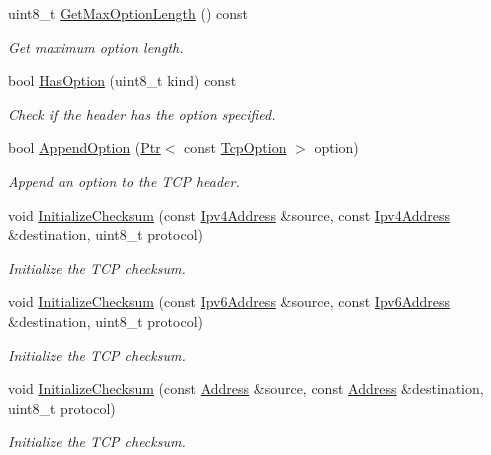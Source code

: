 \begin{DoxyCompactItemize}
uint8\+\_\+t \hyperlink{classns3_1_1TcpHeader_af2ba1251ef62ac43666868af87b79fcb}{Get\+Max\+Option\+Length} () const 
\begin{DoxyCompactList}\small\item\em Get maximum option length. \end{DoxyCompactList}\item 
bool \hyperlink{classns3_1_1TcpHeader_aacc07bdab91925f1cddf9bcb1ae91d13}{Has\+Option} (uint8\+\_\+t kind) const 
\begin{DoxyCompactList}\small\item\em Check if the header has the option specified. \end{DoxyCompactList}\item 
bool \hyperlink{classns3_1_1TcpHeader_aa5de13df3dd5cb87d63c428e5dcc3425}{Append\+Option} (\hyperlink{classns3_1_1Ptr}{Ptr}$<$ const \hyperlink{classns3_1_1TcpOption}{Tcp\+Option} $>$ option)
\begin{DoxyCompactList}\small\item\em Append an option to the T\+CP header. \end{DoxyCompactList}\item 
void \hyperlink{classns3_1_1TcpHeader_a7fad3c01c249e266ae3f447431661aac}{Initialize\+Checksum} (const \hyperlink{classns3_1_1Ipv4Address}{Ipv4\+Address} \&source, const \hyperlink{classns3_1_1Ipv4Address}{Ipv4\+Address} \&destination, uint8\+\_\+t protocol)
\begin{DoxyCompactList}\small\item\em Initialize the T\+CP checksum. \end{DoxyCompactList}\item 
void \hyperlink{classns3_1_1TcpHeader_af81746c272cb814d762b72e2e48f0515}{Initialize\+Checksum} (const \hyperlink{classns3_1_1Ipv6Address}{Ipv6\+Address} \&source, const \hyperlink{classns3_1_1Ipv6Address}{Ipv6\+Address} \&destination, uint8\+\_\+t protocol)
\begin{DoxyCompactList}\small\item\em Initialize the T\+CP checksum. \end{DoxyCompactList}\item 
void \hyperlink{classns3_1_1TcpHeader_ac97b82ed37e97ae48f8f32dced3d0edb}{Initialize\+Checksum} (const \hyperlink{classns3_1_1Address}{Address} \&source, const \hyperlink{classns3_1_1Address}{Address} \&destination, uint8\+\_\+t protocol)
\begin{DoxyCompactList}\small\item\em Initialize the T\+CP checksum. \end{DoxyCompactList}\item 

\end{DoxyCompactItemize}
